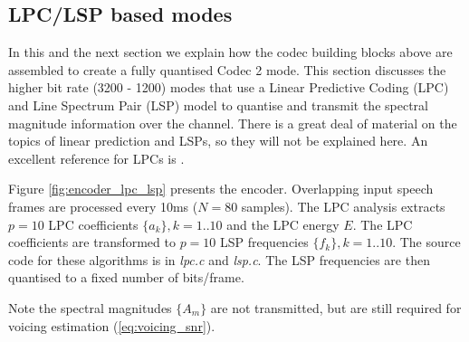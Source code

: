\documentclass{article}
\begin{document}
\subsection{LPC/LSP based modes}
\label{sect:mode_lpc_lsp}

In this and the next section we explain how the codec building blocks above are assembled to create a fully quantised Codec 2 mode.  This section discusses the higher bit rate (3200 - 1200) modes that use a Linear Predictive Coding (LPC) and Line Spectrum Pair (LSP) model to quantise and transmit the spectral magnitude information over the channel.  There is a great deal of material on the topics of linear prediction and LSPs, so they will not be explained here.  An excellent reference for LPCs is \cite{makhoul1975linear}.

Figure \ref{fig:encoder_lpc_lsp} presents the encoder. Overlapping input speech frames are processed every 10ms ($N=80$ samples).  The LPC analysis extracts $p=10$ LPC coefficients $\{a_k\}, k=1..10$ and the LPC energy $E$.  The LPC coefficients are transformed to $p=10$ LSP frequencies $\{f_k\}, k=1..10$. The source code for these algorithms is in \emph{lpc.c} and \emph{lsp.c}.  The LSP frequencies are then quantised to a fixed number of bits/frame.

Note the spectral magnitudes $\{A_m\}$ are not transmitted, but are still required for voicing estimation (\ref{eq:voicing_snr}).
\end{document}
